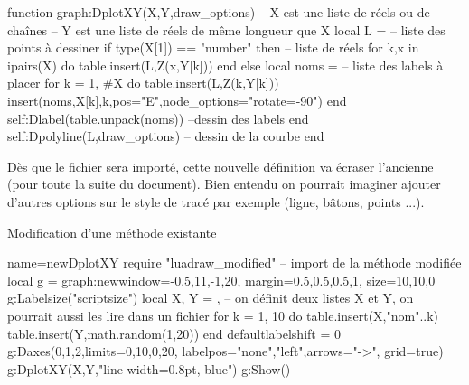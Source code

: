 \begin{Luacode}
function graph:DplotXY(X,Y,draw_options)
-- X est une liste de réels ou de chaînes
-- Y est une liste de réels de même longueur que X 
    local L = {} -- liste des points à dessiner
    if type(X[1]) == "number" then -- liste de réels
        for k,x in ipairs(X) do
            table.insert(L,Z(x,Y[k]))
        end
    else
        local noms = {} -- liste des labels à placer
        for k = 1, #X do
            table.insert(L,Z(k,Y[k]))
            insert(noms,{X[k],k,{pos="E",node_options="rotate=-90"}})
        end
        self:Dlabel(table.unpack(noms)) --dessin des labels
    end
    self:Dpolyline(L,draw_options) -- dessin de la courbe
end
\end{Luacode}

Dès que le fichier sera importé, cette nouvelle définition va écraser l'ancienne (pour toute la suite du document). Bien entendu on pourrait imaginer ajouter d'autres options sur le style de tracé par exemple (ligne, bâtons, points ...).

\begin{demo}{Modification d'une méthode existante}
\begin{luadraw}{name=newDplotXY}
require "luadraw_modified" -- import de la méthode modifiée
local g = graph:new{window={-0.5,11,-1,20}, margin={0.5,0.5,0.5,1}, size={10,10,0}}
g:Labelsize("scriptsize")
local X, Y = {}, {} -- on définit deux listes X et Y, on pourrait aussi les lire dans un fichier
for k = 1, 10 do
    table.insert(X,"nom"..k)
    table.insert(Y,math.random(1,20))
end
defaultlabelshift = 0
g:Daxes({0,1,2},{limits={{0,10},{0,20}}, labelpos={"none","left"},arrows="->", grid=true})
g:DplotXY(X,Y,"line width=0.8pt, blue")
g:Show()
\end{luadraw}
\end{demo}
